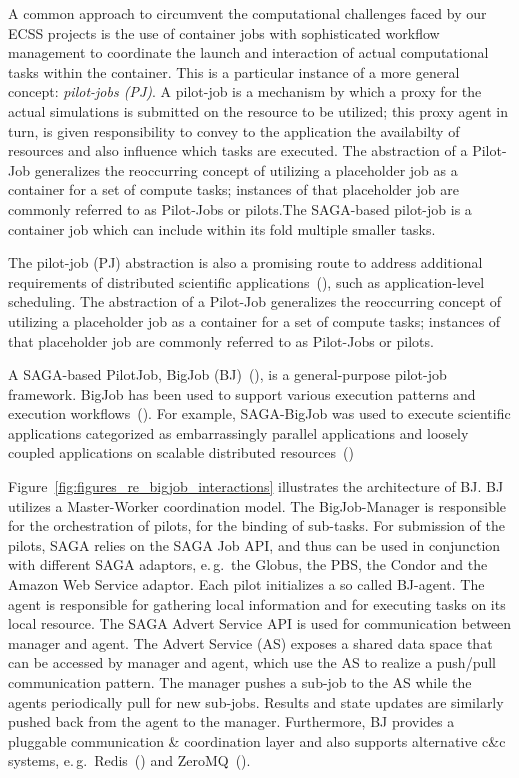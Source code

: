 \documentclass{sig-alternate}
\begin{document}
A common approach to circumvent the computational challenges faced by our ECSS
projects is the use of container jobs with sophisticated workflow management to
coordinate the launch and interaction of actual computational tasks within the
container. This is a particular instance of a more general
concept: \emph{pilot-jobs (PJ)}. A pilot-job is a mechanism by which a proxy
for the actual simulations is submitted on the resource to be
utilized; this proxy agent in turn, is given responsibility to convey
to the application the availabilty of resources and also influence
which tasks are executed. The abstraction of a Pilot-Job generalizes
the reoccurring concept of utilizing a placeholder job as a container
for a set of compute tasks; instances of that placeholder job are
commonly referred to as Pilot-Jobs or pilots.The SAGA-based pilot-job
is a container job which can include within its fold multiple smaller
tasks.

The pilot-job (PJ) abstraction is also a promising route to address
additional requirements of distributed scientific
applications~(\cite{ko-efficient,bigjob_cloudcom10}), such as
application-level scheduling. The abstraction of a Pilot-Job
generalizes the reoccurring concept of utilizing a placeholder job
as a container for a set of compute tasks; instances of that
placeholder job are commonly referred to as Pilot-Jobs or pilots.

A SAGA-based PilotJob, BigJob (BJ)~(\cite{bigjob_web,saga_bigjob_condor_cloud}),
is a general-purpose pilot-job framework. BigJob has been used to support
various execution patterns and execution
workflows~(\cite{async_repex11,repex_ptrsa}). For example, SAGA-BigJob was used
to execute scientific applications categorized as embarrassingly parallel
applications and loosely coupled applications on scalable distributed
resources~(\cite{ecmls_ccpe10, dare-ecmls11})

Figure~\ref{fig:figures_re_bigjob_interactions} illustrates the
architecture of BJ. BJ utilizes a Master-Worker coordination
model. The BigJob-Manager is responsible for the orchestration of
pilots, for the binding of sub-tasks. For submission of the pilots,
SAGA relies on the SAGA Job API, and thus can be used in conjunction
with different SAGA adaptors, e.\,g.\ the Globus, the PBS, the Condor
and the Amazon Web Service adaptor. Each pilot initializes a so called
BJ-agent. The agent is responsible for gathering local information and
for executing tasks on its local resource. The SAGA Advert Service API
is used for communication between manager and agent. The Advert
Service (AS) exposes a shared data space that can be accessed by
manager and agent, which use the AS to realize a push/pull
communication pattern.  The manager pushes a sub-job to the AS while
the agents periodically pull for new sub-jobs. Results and state
updates are similarly pushed back from the agent to the
manager. Furthermore, BJ provides a pluggable communication \&
coordination layer and also supports alternative c\&c systems,
e.\,g.\ Redis~(\cite{redis}) and ZeroMQ~(\cite{zmq}).
\end{document}
